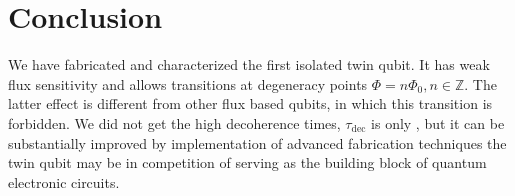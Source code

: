 \section{Conclusion}
\noindent We  have fabricated and  characterized the first isolated  twin qubit.  It  has weak
flux  sensitivity  and   allows  \ilra  {}  transitions   at  degeneracy  points
$ \Phi =  n\Phi_0, n\in\mathbb{Z} $. The latter  effect is different from other flux  based qubits, in
which  this   transition  is  forbidden.   We   did  not  get  the   high  decoherence  times,
$\tau_{\text{dec}}$  is   only  ,   but  it  can   be  substantially   improved  by
implementation of  advanced fabrication  techniques the  twin qubit may  be in  competition of
serving as the building block of quantum electronic circuits.


\noindent
